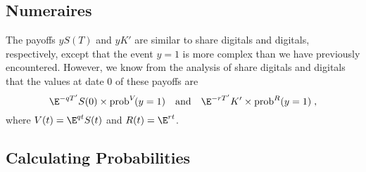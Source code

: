 \subsection*{Numeraires}
The payoffs $yS(T)$ and $yK'$ are similar to share digitals and digitals, respectively, except that the event $y=1$ is more complex than we have previously encountered.  However, we know from the analysis of share digitals and digitals that the values at date 0 of these payoffs are 
$$\E^{-q T'}S(0)\times\text{prob}^V\!(y=1) \quad \text{and}\quad \E^{-rT'}K'\times\text{prob}^R(y=1)\; ,$$
where $V(t)=\E^{qt}S(t)$ and $R(t)=\E^{rt}$.  

\subsection*{Calculating Probabilities}

